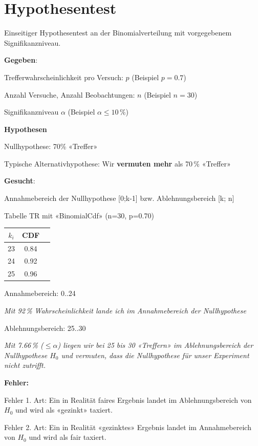 \headerUndFooterJedeSeite{}
\newpage
\headerUndFooterJedeSeite{}

\section*{Hypothesentest}
Einseitiger Hypothesentest an der Binomialverteilung mit vorgegebenem Signifikanzniveau.

\textbf{Gegeben}:

Trefferwahrscheinlichkeit pro Versuch: $p$ (Beispiel $p=0.7$)

Anzahl Versuche, Anzahl Beobachtungen: $n$ (Beispiel $n=30$)

Signifikanzniveau $\alpha$ (Beispiel $\alpha \le 10\,\%$)

\textbf{Hypothesen}

Nullhypothese: 70\% «Treffer»

Typische Alternativhypothese: Wir \textbf{vermuten mehr} als 70\,\% «Treffer»


\textbf{Gesucht}:

Annahmebereich der Nullhypothese [0;k-1] bzw. Ablehnungsbereich [k; n]

Tabelle TR mit «BinomialCdf» (n=30, p=0.70)

\begin{tabular}{ccc}\hline
  $k_i$ & CDF \\\hline
  23  & 0.84 \\
  24  & 0.92 \\
  25  & 0.96
  \end{tabular}

Annahmebereich: 0..24

\textit{Mit 92\,\% Wahrscheinlichkeit lande ich im Annahmebereich der Nullhypothese}

Ablehnungsbereich: 25..30 

\textit{Mit 7.66\,\% ($\le \alpha$) liegen wir bei 25 bis 30
  «Treffern» im Ablehnungsbereich der Nullhypothese $H_0$
  und vermuten, dass die Nullhypothese für unser Experiment nicht zutrifft.}


\textbf{Fehler:}

Fehler 1. Art: Ein in Realität faires Ergebnis landet im
Ablehnungsbereich von $H_0$ und wird als «gezinkt» taxiert.

Fehler 2. Art: Ein in Realität «gezinktes» Ergebnis landet im
Annahmebereich von $H_0$ und wird als fair taxiert.


